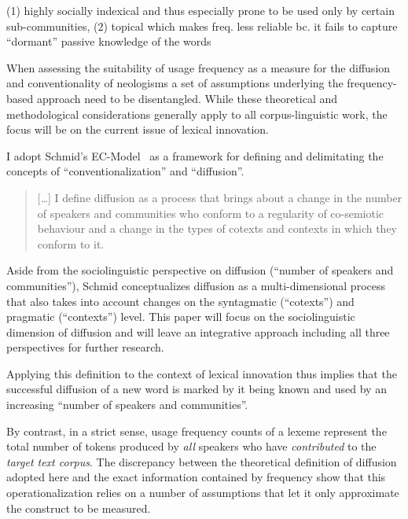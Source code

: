 \documentclass[
  a4paper,
  abstract=on,
  captions=tableabove
  ]{scrartcl}
\begin{document}
  (1) highly socially indexical and thus especially prone to be used only by certain sub-communities,
  (2) topical which makes freq. less reliable bc. it fails to capture \enquote{dormant} passive knowledge of the words

  When assessing the suitability of usage frequency as a measure for the diffusion and conventionality of neologisms a set of assumptions underlying the frequency-based approach need to be disentangled. While these theoretical and methodological considerations generally apply to all corpus-linguistic work, the focus will be on the current issue of lexical innovation.

  I adopt Schmid's EC-Model~\parencite{Schmid2020DynamicsLinguistic} as a framework for defining and delimitating the concepts of \enquote{conventionalization} and \enquote{diffusion}.

  \begin{quote}
  [\dots] I define diffusion as a process that brings about a change in the number of speakers and communities who conform to a regularity of co-semiotic behaviour and a change in the types of cotexts and contexts in which they conform to it.
  \end{quote}

  Aside from the sociolinguistic perspective on diffusion (\enquote{number of speakers and communities}), Schmid conceptualizes diffusion as a multi-dimensional process that also takes into account changes on the syntagmatic (\enquote{cotexts}) and pragmatic (\enquote{contexts}) level. This paper will focus on the sociolinguistic dimension of diffusion and will leave an integrative approach including all three perspectives for further research.

  Applying this definition to the context of lexical innovation thus implies that the successful diffusion of a new word is marked by it being known and used by an increasing \enquote{number of speakers and communities}.

  By contrast, in a strict sense, usage frequency counts of a lexeme represent the total number of tokens produced by \emph{all} speakers who have \emph{contributed} to the \emph{target text corpus}. The discrepancy between the theoretical definition of diffusion adopted here and the exact information contained by frequency show that this operationalization relies on a number of assumptions that let it only approximate the construct to be measured.
\end{document}
